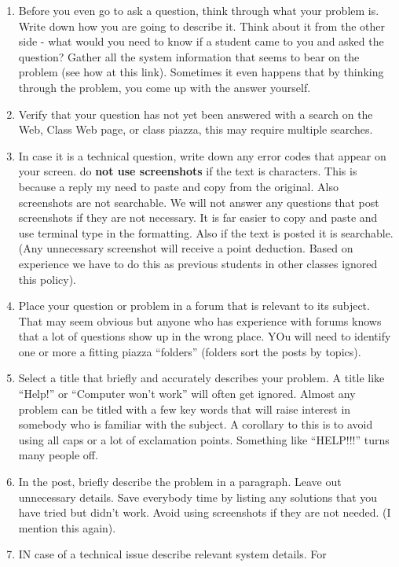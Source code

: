 \begin{enumerate}
\item
  Before you even go to ask a question, think through what your problem
  is. Write down how you are going to describe it. Think about it from
  the other side - what would you need to know if a student came to you
  and asked the question? Gather all the system information that seems
  to bear on the problem (see how at this link). Sometimes it even
  happens that by thinking through the problem, you come up with the
  answer yourself.
\item
  Verify that your question has not yet been answered with a search on
  the Web, Class Web page, or class piazza, this may require multiple
  searches.
\item
  In case it is a technical question, write down any error codes that
  appear on your screen. do \textbf{not use screenshots} if the text is
  characters. This is because a reply my need to paste and copy from the
  original. Also screenshots are not searchable. We will not answer any
  questions that post screenshots if they are not necessary. It is far
  easier to copy and paste and use terminal type in the formatting. Also
  if the text is posted it is searchable. (Any unnecessary screenshot
  will receive a point deduction. Based on experience we have to do this
  as previous students in other classes ignored this policy).
\item
  Place your question or problem in a forum that is relevant to its
  subject. That may seem obvious but anyone who has experience with
  forums knows that a lot of questions show up in the wrong place. YOu
  will need to identify one or more a fitting piazza ``folders''
  (folders sort the posts by topics).
\item
  Select a title that briefly and accurately describes your problem. A
  title like ``Help!'' or ``Computer won't work'' will often get
  ignored. Almost any problem can be titled with a few key words that
  will raise interest in somebody who is familiar with the subject. A
  corollary to this is to avoid using all caps or a lot of exclamation
  points. Something like ``HELP!!!'' turns many people off.
\item
  In the post, briefly describe the problem in a paragraph. Leave out
  unnecessary details. Save everybody time by listing any solutions that
  you have tried but didn't work. Avoid using screenshots if they are
  not needed. (I mention this again).
\item
  IN case of a technical issue describe relevant system details. For

\end{enumerate}
